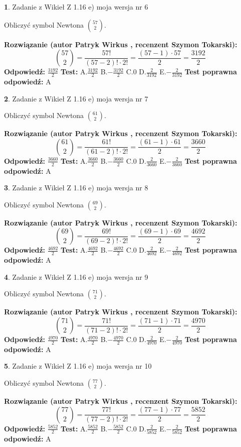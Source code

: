 \documentclass[12pt, a4paper]{article}
\theoremstyle{definition} %
\newtheorem{zad}{}
\newcommand{\zadStart}[1]{\begin{zad}#1\newline}
\newcommand{\zadStop}{\end{zad}}
\newcommand{\rozwStart}[2]{\noindent \textbf{Rozwiązanie (autor #1 , recenzent #2): }\newline}
\newcommand{\rozwStop}{\newline}
\newcommand{\odpStart}{\noindent \textbf{Odpowiedź:}\newline}
\newcommand{\odpStop}{\newline}
\newcommand{\testStart}{\noindent \textbf{Test:}\newline}
\newcommand{\testStop}{\newline}
\newcommand{\kluczStart}{\noindent \textbf{Test poprawna odpowiedź:}\newline}
\newcommand{\kluczStop}{\newline}
\begin{document}
\zadStart{Zadanie z Wikieł Z 1.16 e) moja wersja nr 6}

Obliczyć symbol Newtona ${57 \choose 2}$.
\zadStop
\rozwStart{Patryk Wirkus}{Szymon Tokarski}
$${57 \choose 2} = \frac{57!}{(57-2)! \cdot 2!} = \frac{(57-1) \cdot 57}{2} = \frac{3192}{2}$$
\rozwStop
\odpStart
$\frac{3192}{2}$
\odpStop
\testStart
A.$\frac{3192}{2}$ B.$-\frac{3192}{2}$ C.$0$ D.$\frac{2}{3192}$ E.$-\frac{2}{3192}$
\testStop
\kluczStart
A
\kluczStop



\zadStart{Zadanie z Wikieł Z 1.16 e) moja wersja nr 7}

Obliczyć symbol Newtona ${61 \choose 2}$.
\zadStop
\rozwStart{Patryk Wirkus}{Szymon Tokarski}
$${61 \choose 2} = \frac{61!}{(61-2)! \cdot 2!} = \frac{(61-1) \cdot 61}{2} = \frac{3660}{2}$$
\rozwStop
\odpStart
$\frac{3660}{2}$
\odpStop
\testStart
A.$\frac{3660}{2}$ B.$-\frac{3660}{2}$ C.$0$ D.$\frac{2}{3660}$ E.$-\frac{2}{3660}$
\testStop
\kluczStart
A
\kluczStop



\zadStart{Zadanie z Wikieł Z 1.16 e) moja wersja nr 8}

Obliczyć symbol Newtona ${69 \choose 2}$.
\zadStop
\rozwStart{Patryk Wirkus}{Szymon Tokarski}
$${69 \choose 2} = \frac{69!}{(69-2)! \cdot 2!} = \frac{(69-1) \cdot 69}{2} = \frac{4692}{2}$$
\rozwStop
\odpStart
$\frac{4692}{2}$
\odpStop
\testStart
A.$\frac{4692}{2}$ B.$-\frac{4692}{2}$ C.$0$ D.$\frac{2}{4692}$ E.$-\frac{2}{4692}$
\testStop
\kluczStart
A
\kluczStop



\zadStart{Zadanie z Wikieł Z 1.16 e) moja wersja nr 9}

Obliczyć symbol Newtona ${71 \choose 2}$.
\zadStop
\rozwStart{Patryk Wirkus}{Szymon Tokarski}
$${71 \choose 2} = \frac{71!}{(71-2)! \cdot 2!} = \frac{(71-1) \cdot 71}{2} = \frac{4970}{2}$$
\rozwStop
\odpStart
$\frac{4970}{2}$
\odpStop
\testStart
A.$\frac{4970}{2}$ B.$-\frac{4970}{2}$ C.$0$ D.$\frac{2}{4970}$ E.$-\frac{2}{4970}$
\testStop
\kluczStart
A
\kluczStop



\zadStart{Zadanie z Wikieł Z 1.16 e) moja wersja nr 10}

Obliczyć symbol Newtona ${77 \choose 2}$.
\zadStop
\rozwStart{Patryk Wirkus}{Szymon Tokarski}
$${77 \choose 2} = \frac{77!}{(77-2)! \cdot 2!} = \frac{(77-1) \cdot 77}{2} = \frac{5852}{2}$$
\rozwStop
\odpStart
$\frac{5852}{2}$
\odpStop
\testStart
A.$\frac{5852}{2}$ B.$-\frac{5852}{2}$ C.$0$ D.$\frac{2}{5852}$ E.$-\frac{2}{5852}$
\testStop
\kluczStart
A
\kluczStop
\end{document}
